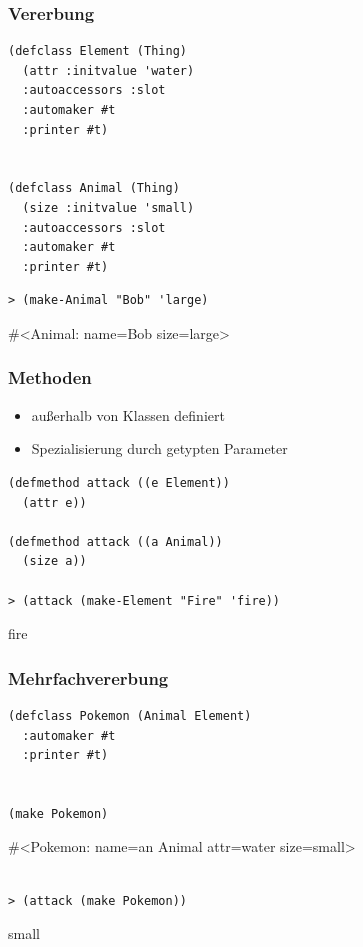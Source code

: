 \documentclass{beamer}
\newcommand{\routput}{\vspace{-0.25cm}\hspace{5pt}\footnotesize\color{blue}\ttfamily}
\newcommand{\rsymbol}{\vspace{-0.25cm}\hspace{5pt}\footnotesize\color{blue}\ttfamily\textquotesingle}
\newcommand{\qq}{\textquotedbl}
\begin{document}
\begin{frame}[fragile]
 \frametitle{Vererbung}
\begin{lstlisting}
(defclass Element (Thing)
  (attr :initvalue 'water)
  :autoaccessors :slot 
  :automaker #t
  :printer #t)
  
  
(defclass Animal (Thing)
  (size :initvalue 'small)
  :autoaccessors :slot
  :automaker #t
  :printer #t)
\end{lstlisting}\vspace{1cm}

\begin{lstlisting}
> (make-Animal "Bob" 'large)
\end{lstlisting}\vspace{0.6cm}
{\routput \#<Animal: name={\qq}Bob{\qq} size=large>}
\end{frame}

\begin{frame}[fragile]
 \frametitle{Methoden}
 \begin{itemize}
  \item außerhalb von Klassen definiert
  \item Spezialisierung durch getypten Parameter
 \end{itemize}
\begin{lstlisting}
(defmethod attack ((e Element))
  (attr e))
  
(defmethod attack ((a Animal))
  (size a))

> (attack (make-Element "Fire" 'fire))
\end{lstlisting}\vspace{0.6cm}
{\rsymbol fire}
\end{frame}

\begin{frame}[fragile]
 \frametitle{Mehrfachvererbung}
\begin{lstlisting}
(defclass Pokemon (Animal Element)
  :automaker #t
  :printer #t)

  
(make Pokemon)
\end{lstlisting}\vspace{0.6cm}
{\routput \#<Pokemon: name={\qq}an Animal{\qq} attr=water size=small>}

\begin{lstlisting}

> (attack (make Pokemon))
\end{lstlisting}\vspace{0.6cm}
{\rsymbol small}
\end{frame}
\end{document}
